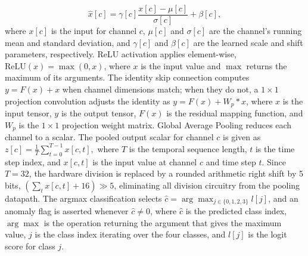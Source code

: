 \documentclass[conference]{IEEEtran}
\begin{document}
\begin{equation}
\hat{x}[c] = \gamma[c] \frac{x[c] - \mu[c]}{\sigma[c]} + \beta[c],
\label{eq:bn}
\end{equation}
where $x[c]$ is the input for channel $c$, $\mu[c]$ and $\sigma[c]$ are the channel's running mean and standard deviation, and $\gamma[c]$ and $\beta[c]$ are the learned scale and shift parameters, respectively. ReLU activation applies element-wise, $\text{ReLU}(x) = \max(0, x)$, where $x$ is the input value and $\max$ returns the maximum of its arguments. The identity skip connection computes $y = F(x) + x$ when channel dimensions match; when they do not, a $1\times1$ projection convolution adjusts the identity as $y = F(x) + W_p\ast x$, where $x$ is the input tensor, $y$ is the output tensor, $F(x)$ is the residual mapping function, and $W_p$ is the $1\times1$ projection weight matrix. Global Average Pooling reduces each channel to a scalar. The pooled output scalar for channel $c$ is given as $ z[c] = \frac{1}{T} \sum_{t=0}^{T-1} x[c, t],$
where $T$ is the temporal sequence length, $t$ is the time step index, and $x[c, t]$ is the input value at channel $c$ and time step $t$. Since $T = 32$, the hardware division is replaced by a rounded arithmetic right shift by 5 bits, $(\sum_t x[c,t] + 16) \gg 5$, eliminating all division circuitry from the pooling datapath. The argmax classification selects $\hat{c} = \arg\max_{j \in \{0,1,2,3\}} l[j]$, and an anomaly flag is asserted whenever $\hat{c} \neq 0$, where $\hat{c}$ is the predicted class index, $\arg\max$ is the operation returning the argument that gives the maximum value, $j$ is the class index iterating over the four classes, and $l[j]$ is the logit score for class $j$.
\end{document}
